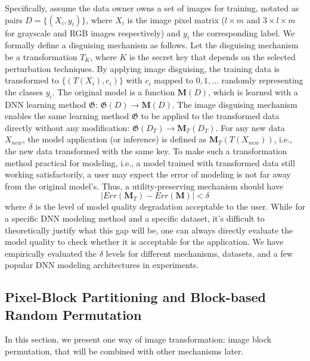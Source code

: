 \documentclass[conference]{IEEEtran}
\begin{document}
Specifically, assume the data owner owns a set of images for training, notated as pairs $D=\{(X_i, y_i)\}$, where $X_i$ is the image pixel matrix (${l\times m}$ and ${3\times l \times m}$ for grayscale and RGB images respectively) and $y_i$ the corresponding label. We formally define a disguising mechanism as follows. Let the disguising mechanism be a transformation $T_K$, where $K$ is the secret key that depends on the selected perturbation techniques. By applying image disguising, the training data is transformed to $\{(T(X_i), c_i)\}$ with $c_i$ mapped to $0,1 , \dots$ randomly representing the classes $y_i$.  The original model is a function $\mathbf{M}(D)$, which is learned with a DNN learning method $\mathfrak{G}$: $\mathfrak{G}(D) \rightarrow \mathbf{M}(D)$. The image disguising mechanism enables the same learning method $\mathfrak{G}$ to be applied to the transformed data directly without any modification:  $\mathfrak{G}(D_T) \rightarrow \mathbf{M}_T(D_T)$. For any new data $X_{new}$, the model application (or inference) is defined as $\mathbf{M}_T(T(X_{new}))$, i.e., the new data transformed with the same key. 
To make such a transformation method practical for modeling, i.e., a model trained with transformed data still working satisfactorily, a user may expect the error of modeling is not far away from the original model's. Thus, a utility-preserving mechanism should have 
\[
|Err(\mathbf{M}_T) - Err(\mathbf{M})| < \delta
\]
where $\delta$ is the level of model quality degradation acceptable to the user. While for a specific DNN modeling method and a specific dataset, it's difficult  to theoretically justify what this gap will be, one can always directly evaluate the model quality to check whether it is acceptable for the application. We have empirically evaluated the $\delta$ levels for different mechanisms, datasets, and a few popular DNN modeling architectures in experiments.



\subsection{Pixel-Block Partitioning and Block-based Random Permutation}\label{subsec:perm} 
In this section, we present one way of image transformation: image block permutation, that will be combined with other mechanisms later. 
\end{document}
